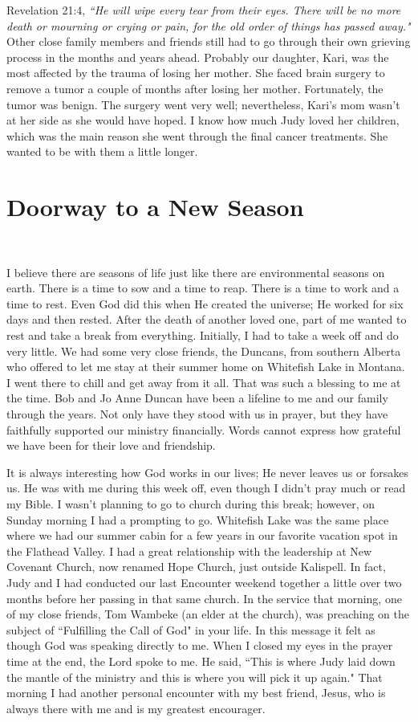\documentclass[oneside]{book}
\begin{document}
Revelation 21:4, \textit{``He will wipe every tear from their eyes. There will be no more death or mourning or crying or pain, for the old order of things has passed away."}
Other close family members and friends still had to go through their own grieving process in the months and years ahead. Probably our daughter, Kari, was the most affected by the trauma of losing her mother. She faced brain surgery to remove a tumor a couple of months after losing her mother. Fortunately, the tumor was benign. The surgery went very well; nevertheless, Kari's mom wasn't at her side as she would have hoped. I know how much Judy loved her children, which was the main reason she went through the final cancer treatments. She wanted to be with them a little longer.


\section{Doorway to a New Season}
\

I believe there are seasons of life just like there are environmental seasons on earth. There is a time to sow and a time to reap. There is a time to work and a time to rest. Even God did this when He created the universe; He worked for six days and then rested. After the death of another loved one, part of me wanted to rest and take a break from everything. Initially, I had to take a week off and do very little. We had some very close friends, the Duncans, from southern Alberta who offered to let me stay at their summer home on Whitefish Lake in Montana. I went there to chill and get away from it all. That was such a blessing to me at the time. Bob and Jo Anne Duncan have been a lifeline to me and our family through the years. Not only have they stood with us in prayer, but they have faithfully supported our ministry financially. Words cannot express how grateful we have been for their love and friendship.

It is always interesting how God works in our lives; He never leaves us or forsakes us. He was with me during this week off, even though I didn't pray much or read my Bible. I wasn't planning to go to church during this break; however, on Sunday morning I had a prompting to go. Whitefish Lake was the same place where we had our summer cabin for a few years in our favorite vacation spot in the Flathead Valley. I had a great relationship with the leadership at New Covenant Church, now renamed Hope Church, just outside Kalispell. In fact, Judy and I had conducted our last Encounter weekend together a little over two months before her passing in that same church. In the service that morning, one of my close friends, Tom Wambeke (an elder at the church), was preaching on the subject of ``Fulfilling the Call of God" in your life. In this message it felt as though God was speaking directly to me. When I closed my eyes in the prayer time at the end, the Lord spoke to me. He said, ``This is where Judy laid down the mantle of the ministry and this is where you will pick it up again." That morning I had another personal encounter with my best friend, Jesus, who is always there with me and is my greatest encourager.
\end{document}
